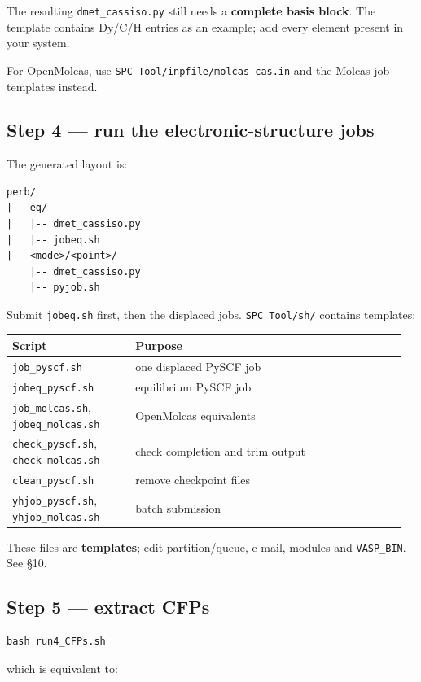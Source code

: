 \documentclass[11pt,a4paper]{article}
\begin{document}
The resulting \texttt{dmet\_cassiso.py} still needs a \textbf{complete
basis block}. The template contains Dy/C/H entries as an example; add
every element present in your system.

For OpenMolcas, use \texttt{SPC\_Tool/inpfile/molcas\_cas.in} and the
Molcas job templates instead.

\subsection{Step 4 --- run the electronic-structure
jobs}\label{step-4-run-the-electronic-structure-jobs}

The generated layout is:

\begin{lstlisting}
perb/
|-- eq/
|   |-- dmet_cassiso.py
|   |-- jobeq.sh
|-- <mode>/<point>/
    |-- dmet_cassiso.py
    |-- pyjob.sh
\end{lstlisting}

Submit \texttt{jobeq.sh} first, then the displaced jobs.
\texttt{SPC\_Tool/sh/} contains templates:

\begin{longtable}[]{@{}>{\raggedright\arraybackslash}p{0.30\linewidth} >{\raggedright\arraybackslash}p{0.66\linewidth}@{}}
\toprule
Script & Purpose\tabularnewline
\midrule
\endhead
\texttt{job\_pyscf.sh} & one displaced PySCF job\tabularnewline
\texttt{jobeq\_pyscf.sh} & equilibrium PySCF job\tabularnewline
\texttt{job\_molcas.sh}, \texttt{jobeq\_molcas.sh} & OpenMolcas
equivalents\tabularnewline
\texttt{check\_pyscf.sh}, \texttt{check\_molcas.sh} & check completion
and trim output\tabularnewline
\texttt{clean\_pyscf.sh} & remove checkpoint files\tabularnewline
\texttt{yhjob\_pyscf.sh}, \texttt{yhjob\_molcas.sh} & batch
submission\tabularnewline
\bottomrule
\end{longtable}

These files are \textbf{templates}; edit partition/queue, e-mail,
modules and \texttt{VASP\_BIN}. See \S10.

\subsection{Step 5 --- extract CFPs}\label{step-5-extract-cfps}

\begin{lstlisting}
bash run4_CFPs.sh
\end{lstlisting}

which is equivalent to:
\end{document}
